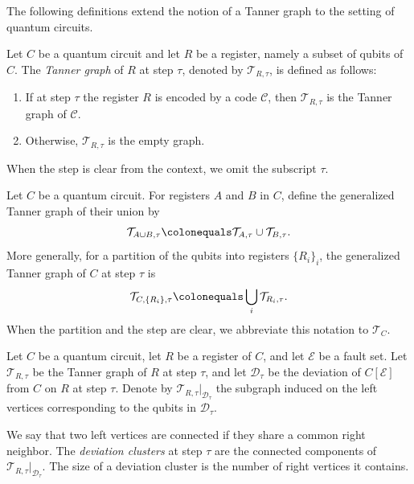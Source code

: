 The following definitions extend the notion of a Tanner graph to the setting of quantum circuits.

\begin{definition}
  Let $C$ be a quantum circuit and let $R$ be a register, namely a subset of qubits of $C$. The \textit{Tanner graph} of $R$ at step $\tau$, denoted by $\mathcal{T}_{R,\tau}$, is defined as follows:
  \begin{enumerate}
    \item If at step $\tau$ the register $R$ is encoded by a code $\mathcal{C}$, then $\mathcal{T}_{R,\tau}$ is the Tanner graph of $\mathcal{C}$.
    \item Otherwise, $\mathcal{T}_{R,\tau}$ is the empty graph.
  \end{enumerate}
  When the step is clear from the context, we omit the subscript $\tau$.
\end{definition}

\begin{definition}
  Let $C$ be a quantum circuit. For registers $A$ and $B$ in $C$, define the generalized Tanner graph of their union by
  \begin{equation*}
    \begin{split}
      \mathcal{T}_{A\cup B,\tau} \colonequals \mathcal{T}_{A,\tau}\cup \mathcal{T}_{B,\tau}.
    \end{split}
  \end{equation*}
  More generally, for a partition of the qubits into registers $\{R_i\}_i$, the generalized Tanner graph of $C$ at step $\tau$ is
  \begin{equation*}
    \begin{split}
      \mathcal{T}_{C,\{R_i\},\tau} \colonequals \bigcup_i \mathcal{T}_{R_i,\tau}.
    \end{split}
  \end{equation*}
  When the partition and the step are clear, we abbreviate this notation to $\mathcal{T}_C$.
\end{definition}

\begin{definition}
  Let $C$ be a quantum circuit, let $R$ be a register of $C$, and let $\mathcal{E}$ be a fault set. Let $\mathcal{T}_{R,\tau}$ be the Tanner graph of $R$ at step $\tau$, and let $\mathcal{D}_{\tau}$ be the deviation of $C[\mathcal{E}]$ from $C$ on $R$ at step $\tau$. Denote by $\mathcal{T}_{R,\tau}|_{\mathcal{D}_{\tau}}$ the subgraph induced on the left vertices corresponding to the qubits in $\mathcal{D}_{\tau}$.

  We say that two left vertices are connected if they share a common right neighbor. The \textit{deviation clusters} at step $\tau$ are the connected components of $\mathcal{T}_{R,\tau}|_{\mathcal{D}_{\tau}}$. The size of a deviation cluster is the number of right vertices it contains.
\end{definition}

